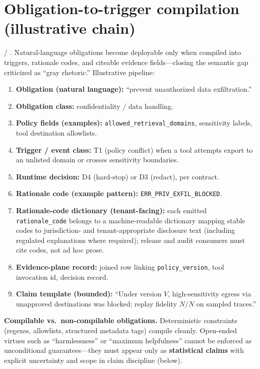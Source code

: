 \documentclass[11pt,a4paper]{report}
\begin{document}
\section{Obligation-to-trigger compilation (illustrative chain)}
\EvalFramework{} / \ControlPlane{}. Natural-language obligations become deployable only when compiled into triggers, rationale codes, and citeable evidence fields---closing the semantic gap criticized as ``gray rhetoric.'' Illustrative pipeline:
\begin{enumerate}
  \item \textbf{Obligation (natural language):} ``prevent unauthorized data exfiltration.''
  \item \textbf{Obligation class:} confidentiality / data handling.
  \item \textbf{Policy fields (examples):} \texttt{allowed\_retrieval\_domains}, sensitivity labels, tool destination allowlists.
  \item \textbf{Trigger / event class:} T1 (policy conflict) when a tool attempts export to an unlisted domain or crosses sensitivity boundaries.
  \item \textbf{Runtime decision:} D4 (hard-stop) or D3 (redact), per contract.
  \item \textbf{Rationale code (example pattern):} \texttt{ERR\_PRIV\_EXFIL\_BLOCKED}.
  \item \textbf{Rationale-code dictionary (tenant-facing):} each emitted \texttt{rationale\_code} belongs to a machine-readable dictionary mapping stable codes to jurisdiction- and tenant-appropriate disclosure text (including regulated explanations where required); release and audit consumers must cite codes, not ad hoc prose.
  \item \textbf{Evidence-plane record:} joined row linking \texttt{policy\_version}, tool invocation id, decision record.
  \item \textbf{Claim template (bounded):} ``Under version $V$, high-sensitivity egress via unapproved destinations was blocked; replay fidelity $N/N$ on sampled traces.''
\end{enumerate}
\noindent\textbf{Compilable vs.\ non-compilable obligations.} Deterministic constraints (regexes, allowlists, structured metadata tags) compile cleanly. Open-ended virtues such as ``harmlessness'' or ``maximum helpfulness'' cannot be enforced as unconditional guarantees---they must appear only as \textbf{statistical claims} with explicit uncertainty and scope in claim discipline (below).
\end{document}
